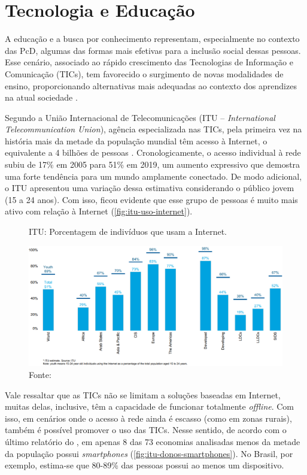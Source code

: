 \section{Tecnologia e Educação}
\label{fundamentacao-teorica:tic}

A educação e a busca por conhecimento representam, especialmente no contexto das PcD, algumas das formas mais efetivas para a inclusão social dessas pessoas. Esse cenário, associado ao rápido crescimento das Tecnologias de Informação e Comunicação (TICs), tem favorecido o surgimento de novas modalidades de ensino, proporcionando alternativas mais adequadas ao contexto dos aprendizes na atual sociedade \cite{Kukulska2005, Castrillo2014}. 

Segundo a União Internacional de Telecomunicações (ITU -- \textit{International Telecommunication Union}), agência especializada nas TICs, pela primeira vez na história mais da metade da população mundial têm acesso à Internet, o equivalente a 4 bilhões de pessoas \cite{Itu2020}. Cronologicamente, o acesso individual à rede subiu de 17\% em 2005 para 51\% em 2019, um aumento expressivo que demostra uma forte tendência para um mundo amplamente conectado. De modo adicional, o ITU apresentou uma variação dessa estimativa considerando o público jovem (15 a 24 anos). Com isso, ficou evidente que esse grupo de pessoas é muito mais ativo com relação à Internet (\autoref{fig:itu-uso-internet}).

\begin{figure}[htbp]
\caption{ITU: Porcentagem de indivíduos que usam a Internet.}
\label{fig:itu-uso-internet}
\centerline{\includegraphics[width=1\textwidth]{images/itu-individuals-using-internet.png}}
\caption*{Fonte: }
\end{figure}

Vale ressaltar que as TICs não se limitam a soluções baseadas em Internet, muitas delas, inclusive, têm a capacidade de funcionar totalmente \textit{offline}. Com isso, em cenários onde o acesso à rede ainda é escasso (como em zonas rurais), também é possível promover o uso das TICs. Nesse sentido, de acordo com o último relatório do , em apenas 8 das 73 economias analisadas menos da metade da população possui \textit{smartphones} (\autoref{fig:itu-donos-smartphones}). No Brasil, por exemplo, estima-se que 80-89\% das pessoas possui ao menos um dispositivo.

